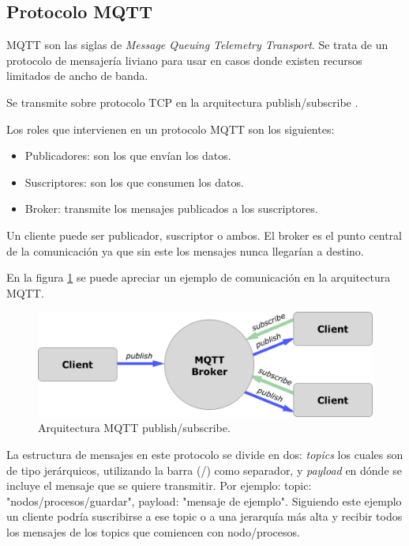 \subsection{Protocolo MQTT}
\label{subsec:mqtt}

MQTT \citep{WEBSITE:MQTT} son las siglas de \textit{Message Queuing Telemetry Transport}. Se trata de un protocolo de mensajería liviano para usar en casos donde existen recursos limitados de ancho de banda. 

Se transmite sobre protocolo TCP en la arquitectura publish/subscribe \citep{WEBSITE:PUBSUB}.

Los roles que intervienen en un protocolo MQTT son los siguientes:
\begin{itemize}
	\item Publicadores: son los que envían los datos.
	\item Suscriptores: son los que consumen los datos.
	\item Broker: transmite los mensajes publicados a los suscriptores.	
\end{itemize}

Un cliente puede ser publicador, suscriptor o ambos. El broker es el punto central de la comunicación ya que sin este los mensajes nunca llegarían a destino. 

En la figura \ref{fig:mqttArq} se puede apreciar un ejemplo de comunicación en la arquitectura MQTT.


\begin{figure}[ht]
	\centering
	\includegraphics[scale=.25]{./Figures/mqtt-diagram.png}
	\caption{Arquitectura MQTT publish/subscribe.}
	\label{fig:mqttArq}
\end{figure}

La estructura de mensajes en este protocolo se divide en dos: \textit{topics} los cuales son de tipo jerárquicos, utilizando la barra (/) como separador, y \textit{payload} en dónde se incluye el mensaje que se quiere transmitir. Por ejemplo: topic: "nodos/procesos/guardar", payload: "mensaje de ejemplo". Siguiendo este ejemplo un cliente podría suscribirse a ese topic o a una jerarquía más alta y recibir todos los mensajes de los topics que comiencen con nodo/procesos. 

